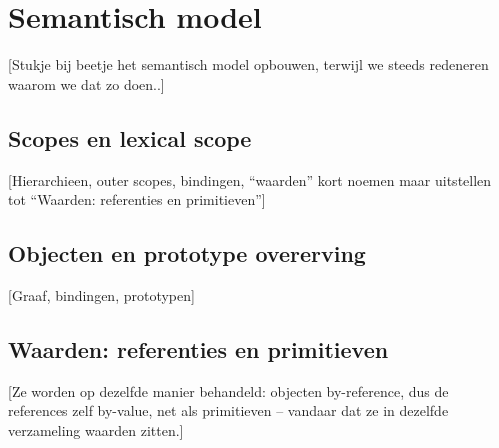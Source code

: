 
\chapter{Semantisch model}

[Stukje bij beetje het semantisch model opbouwen, terwijl we steeds redeneren waarom we dat zo doen..]

\section{Scopes en lexical scope}

[Hierarchieen, outer scopes, bindingen, ``waarden'' kort noemen maar uitstellen tot ``Waarden: referenties en primitieven'']

\section{Objecten en prototype overerving}

[Graaf, bindingen, prototypen]

\section{Waarden: referenties en primitieven}

[Ze worden op dezelfde manier behandeld: objecten by-reference, dus de references zelf by-value, net als primitieven -- vandaar dat ze in dezelfde verzameling waarden zitten.]
